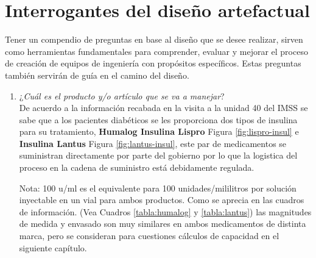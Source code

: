 \section{Interrogantes del diseño artefactual}\rsp
Tener un compendio de preguntas en base al diseño que se desee realizar, sirven como herramientas fundamentales para comprender, evaluar y mejorar el proceso de creación de equipos de ingeniería con propósitos específicos. Estas preguntas también servirán de guía en el camino del diseño.\\[-1cm]

\begin{enumerate}
	\item ¿\textit{Cuál es el producto y/o artículo que se va a manejar}?\\ De acuerdo a la información recabada en la visita a la unidad 40 del IMSS se sabe que a los pacientes diabéticos se les proporciona dos tipos de insulina para su tratamiento, \textbf{Humalog Insulina Lispro} Figura \ref{fig:lispro-insul} e \textbf{Insulina Lantus}  Figura \ref{fig:lantus-insul}, este par de medicamentos se suministran directamente por parte del gobierno por lo que la logistica del proceso en la cadena de suministro está debidamente regulada. 
	
	Nota: 100 u/ml es el equivalente para 100 unidades/mililitros por solución inyectable en un vial para ambos productos. Como se aprecia en las cuadros de información. (Vea Cuadros  \ref{tabla:humalog} y \ref{tabla:lantus})  las magnitudes de medida y envasado son muy similares en ambos medicamentos de distinta marca, pero se consideran para cuestiones cálculos de capacidad en el siguiente capítulo.\rsp
		

\end{enumerate}
